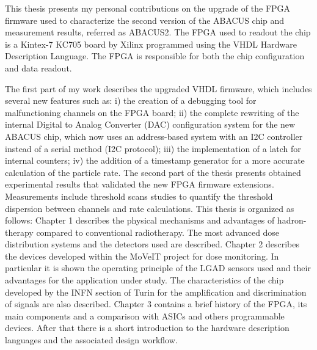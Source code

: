 \newpage
\thispagestyle{plain}
\noindent This thesis presents my personal contributions on the upgrade of the FPGA firmware used to characterize
the second version of the ABACUS chip and measurement results, referred as ABACUS2.
The FPGA used to readout the chip is a Kintex-7 KC705 board by Xilinx programmed using the VHDL Hardware Description Language.
The FPGA is responsible for both the chip configuration and data readout.

\noindent The first part of my work describes the upgraded VHDL firmware, which includes several new features such as:
i) the creation of a debugging tool for malfunctioning channels on the FPGA board;
ii) the complete rewriting of the internal Digital to Analog Converter (DAC) configuration system for the new ABACUS chip, which
now uses an address-based system with an I2C controller instead of a serial method (I2C protocol);
iii) the implementation of a latch for internal counters;
iv) the addition of a timestamp generator for a more accurate calculation of the particle rate.
\newline
The second part of the thesis presents obtained experimental results that validated the new FPGA firmware extensions.
Measurements include threshold scans studies to quantify the threshold dispersion between channels and rate calculations.
\vspace{1cm}
\newline
This thesis is organized as follows:
\vspace{0.25cm}
\newline
Chapter 1 describes the physical mechanisms and advantages of hadron-therapy compared to conventional radiotherapy. The most advanced dose distribution systems and the detectors used are described.
\vspace{0.25cm}
\newline
Chapter 2 describes the devices developed within the MoVeIT project for dose monitoring.
In particular it is shown the operating principle of the LGAD sensors used and their advantages for the application under study.
The characteristics of the chip developed by the INFN section of Turin for the amplification and discrimination of signals are also described.
\vspace{0.25cm}
\newline
Chapter 3 contains a brief history of the FPGA, its main components and a comparison with ASICs and others programmable devices.
After that there is a short introduction to the hardware description languages and the associated design workflow.
